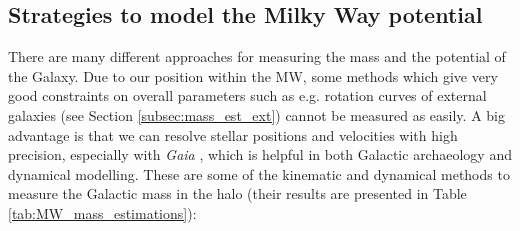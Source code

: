 \subsection{Strategies to model the Milky Way potential}\label{subsec:mass_est_MW}
There are many different approaches for measuring the mass and the potential of the Galaxy. Due to our position within the \ac{MW}, some methods which give very good constraints on overall parameters such as e.g. rotation curves of external galaxies (see Section \ref{subsec:mass_est_ext}) cannot be measured as easily. A big advantage is that we can resolve stellar positions and velocities with high precision, especially with \textit{Gaia} \citep{Gaia...mission...2016, GaiaDR2...overview...2018, GaiaDR...GCs...2018}, which is helpful in both Galactic archaeology and dynamical modelling. These are some of the kinematic and dynamical methods to measure the Galactic mass in the halo (their results are presented in Table \ref{tab:MW_mass_estimations}):
